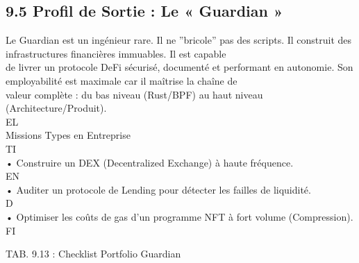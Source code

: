 \documentclass[12pt,landscape,a4paper]{article}
\begin{document}
\subsection{9.5 Profil de Sortie : Le « Guardian »}
Le Guardian est un ingénieur rare. Il ne ”bricole” pas des scripts. Il construit des infrastructures financières immuables. Il est capable\\
de livrer un protocole DeFi sécurisé, documenté et performant en autonomie. Son employabilité est maximale car il maîtrise la chaîne de\\
valeur complète : du bas niveau (Rust/BPF) au haut niveau (Architecture/Produit).\\
\vspace{0.5em}
\vspace{0.5em}
\vspace{0.5em}
\vspace{0.5em}
EL\\
Missions Types en Entreprise\\
\vspace{0.5em}
\vspace{0.5em}
\vspace{0.5em}
\vspace{0.5em}
TI\\
• Construire un DEX (Decentralized Exchange) à haute fréquence.\\
\vspace{0.5em}
\vspace{0.5em}
\vspace{0.5em}
\vspace{0.5em}
EN\\
• Auditer un protocole de Lending pour détecter les failles de liquidité.\\
\vspace{0.5em}
\vspace{0.5em}
\vspace{0.5em}
\vspace{0.5em}
D\\
• Optimiser les coûts de gas d’un programme NFT à fort volume (Compression).\\
\vspace{0.5em}
\vspace{0.5em}
\vspace{0.5em}
\vspace{0.5em}
FI\\
\begin{center}\begin{tabular}TAB. 9.13 : Checklist Portfolio Guardian\end{tabular}\end{center}
\end{document}
